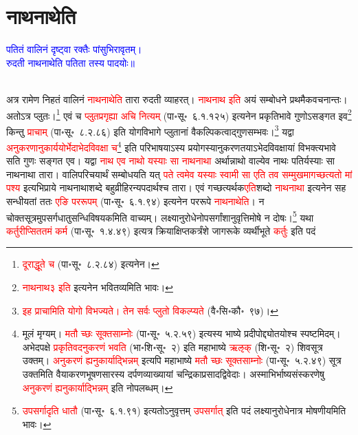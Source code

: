 \section[नाथनाथेति]{नाथनाथेति}
\centering\textcolor{blue}{पतितं वालिनं दृष्ट्वा रक्तैः पांसुभिरावृतम्।\nopagebreak\\
रुदती नाथनाथेति पतिता तस्य पादयोः॥}\nopagebreak\\
\\
\begin{sloppypar}\justifying\noindent\hspace{10mm} अत्र रामेण निहतं वालिनं \textcolor{red}{नाथ\-नाथेति} तारा रुदती व्याहरत्। \textcolor{red}{नाथ\-नाथ इति} अयं सम्बोधने प्रथमैक\-वचनान्तः।
अतोऽत्र प्लुतः।\footnote{\textcolor{red}{दूराद्धूते च} (पा॰सू॰~८.२.८४) इत्यनेन।} एवं च \textcolor{red}{प्लुत\-प्रगृह्या अचि नित्यम्‌} (पा॰सू॰~६.१.१२५) इत्यनेन प्रकृति\-भावे गुणोऽसङ्गत इव\footnote{\textcolor{red}{नाथ\-नाथ३ इति} इत्यनेन भवितव्यमिति भावः।} किन्तु \textcolor{red}{प्राचाम्‌} (पा॰सू॰~८.२.८६) इति योग\-विभागे प्लुतानां वैकल्पिकत्वाद्गुण\-सम्भवः।\footnote{\textcolor{red}{इह प्राचामिति योगो विभज्यते। तेन सर्वः प्लुतो विकल्प्यते} (वै॰सि॰कौ॰~९७)।} यद्वा \textcolor{red}{अनुकरणानु\-कार्ययोर्भेदाभेद\-विवक्षा च}\footnote{मूलं मृग्यम्। \textcolor{red}{मतौ च्छः सूक्तसाम्नोः} (पा॰सू॰~५.२.५९) इत्यस्य भाष्ये प्रदीपोद्द्योतयोश्च स्पष्टमिदम्। अभेदपक्षे \textcolor{red}{प्रकृतिवदनुकरणं भवति} (भा॰शि॰सू॰~२) इति महाभाष्ये \textcolor{red}{ऋऌक्‌} (शि॰सू॰~२) शिवसूत्र उक्तम्। \textcolor{red}{अनुकरणं ह्यनुकार्याद्भिन्नम्‌} इत्यपि महाभाष्ये \textcolor{red}{मतौ च्छः सूक्तसाम्नोः} (पा॰सू॰~५.२.४९) सूत्र उक्तमिति वैयाकरण\-भूषण\-सारस्य दर्पण\-व्याख्यायां चन्द्रिका\-प्रसाद\-द्विवेदाः। अस्माभिर्भाष्य\-संस्करणेषु \textcolor{red}{अनुकरणं ह्यनुकार्याद्भिन्नम्‌} इति नोपलब्धम्।} इति परिभाषयाऽस्य प्रयोगस्यानु\-करणतयाऽभेद\-विवक्षायां विभक्त्यभावे सति गुणः सङ्गत एव। यद्वा \textcolor{red}{नाथ एव नाथो यस्याः सा नाथ\-नाथा} अर्थान्नाथो वाल्येव नाथः पतिर्यस्याः सा नाथ\-नाथा तारा। वालि\-परिचयार्थं सम्बोधयति यत् \textcolor{red}{पते त्वमेव यस्याः स्वामी सा एति तव सम्मुखमागच्छत्यतो मां पश्य} इत्यभिप्राये नाथ\-नाथा\-शब्दे बहुव्रीहिरन्य\-पदार्थश्च तारा। एवं गच्छत्यर्थक\-\textcolor{red}{एति}\-शब्दो \textcolor{red}{नाथ\-नाथा} इत्यनेन सह सन्धीयतां ततः \textcolor{red}{एङि पर\-रूपम्‌} (पा॰सू॰~६.१.९४) इत्यनेन पररूपे \textcolor{red}{नाथ\-नाथेति}। न चोक्त\-सूत्रमुपसर्ग\-धातु\-सन्धि\-विषयकमिति वाच्यम्। 
लक्ष्यानुरोधेनोप\-सर्गांशानुवृत्ति\-मोषे न दोषः।\footnote{\textcolor{red}{उपसर्गादृति धातौ} (पा॰सू॰~६.१.९१) इत्यतोऽनुवृत्तम् \textcolor{red}{उपसर्गात्} इति पदं लक्ष्यानुरोधेनात्र मोषणीयमिति भावः।} यथा \textcolor{red}{कर्तुरीप्सिततमं कर्म} (पा॰सू॰~१.४.४९) इत्यत्र क्रियाक्षिप्त\-कर्त्रंशे जागरूके व्यर्थीभूते \textcolor{red}{कर्तुः} इति पदं

\end{sloppypar}
